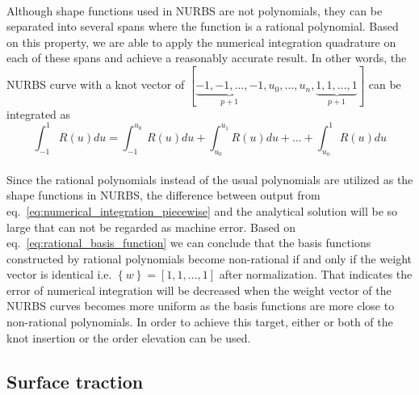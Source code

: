 \paragraph{}
Although shape functions used in NURBS are not polynomials, they can be separated into several spans where the function is a 
    rational polynomial. 
Based on this property, we are able to apply the numerical integration quadrature on each of these spans and achieve a reasonably 
    accurate result.
In other words, the NURBS curve with a knot vector of 
$[ 
    \underbrace{-1,-1,\dots,-1}_{p+1}, 
    u_0,\dots,u_n, 
    \underbrace{1,1,\dots,1 }_{p+1}
]$
can be integrated as
\begin{equation}
    \int_{-1}^{1} R(u) du = \int_{-1}^{u_0} R(u)du + 
                            \int_{u_0}^{u_1} R(u)du + \dots +
                            \int_{u_n}^1 R(u)du
\label{eq:numerical_integration_piecewise}
\end{equation}

\paragraph{}
Since the rational polynomials instead of the usual polynomials are utilized as the shape functions in NURBS, the difference between
    output from eq.~\ref{eq:numerical_integration_piecewise} and the analytical solution will be so large that can not be regarded as
    machine error.
Based on eq.~\ref{eq:rational_basis_function} we can conclude that the basis functions constructed by rational polynomials become
    non-rational if and only if the weight vector is identical i.e. $\left\{ w \right\} = \left[ 1,1,\dots,1 \right]$ after normalization.
That indicates the error of numerical integration will be decreased when the weight vector of the NURBS curves becomes more uniform as
    the basis functions are more close to non-rational polynomials.
In order to achieve this target, either or both of the knot insertion or the order elevation can be used.
\pagebreak

\subsection{Surface traction}
\label{subsection_surface_traction}
